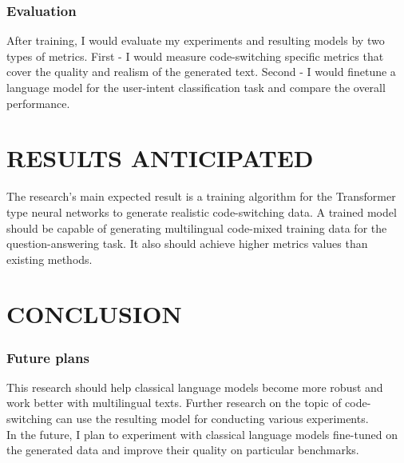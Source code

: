 \documentclass{beamer}
\begin{document}

\begin{frame}
\frametitle{Evaluation}
After training, I would evaluate my experiments and resulting models by two types of metrics. First - I would measure code-switching specific metrics that cover the quality and realism of the generated text. Second - I would finetune a language model for the user-intent classification task and compare the overall performance.
\end{frame}


\section{RESULTS ANTICIPATED}

\begin{frame}
The research’s main expected result is a training algorithm for the Transformer type neural networks to generate realistic code-switching data. A trained model should be capable of generating multilingual code-mixed training data for the question-answering task. It also should achieve higher metrics values than existing methods.
\end{frame}


\section{CONCLUSION}

\begin{frame}
\frametitle{Future plans}
This research should help classical language models become more robust and work better with multilingual texts. Further research on the topic of code-switching can use the resulting model for conducting various experiments.
\\
In the future, I plan to experiment with classical language models fine-tuned on the generated data and improve their quality on particular benchmarks.
\end{frame}

\end{document}
